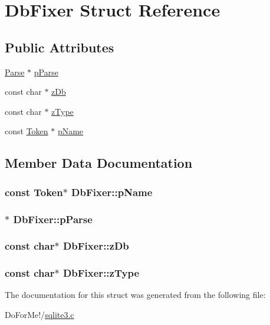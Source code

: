 \hypertarget{struct_db_fixer}{\section{Db\-Fixer Struct Reference}
\label{struct_db_fixer}
}
\subsection*{Public Attributes}
\begin{DoxyCompactItemize}
\item 
\hyperlink{struct_parse}{Parse} $\ast$ \hyperlink{struct_db_fixer_ac5c9b8bca3b05a66faea11dd998bf6f6}{p\-Parse}
\item 
const char $\ast$ \hyperlink{struct_db_fixer_aba91df5965a99915d9180805d02c4a7f}{z\-Db}
\item 
const char $\ast$ \hyperlink{struct_db_fixer_ae4748d9e97560b7b332527434408c2e8}{z\-Type}
\item 
const \hyperlink{struct_token}{Token} $\ast$ \hyperlink{struct_db_fixer_aedee20e10de7337651b84656ee81b39c}{p\-Name}
\end{DoxyCompactItemize}


\subsection{Member Data Documentation}
\hypertarget{struct_db_fixer_aedee20e10de7337651b84656ee81b39c}{
\subsubsection[{p\-Name}]{\setlength{\rightskip}{0pt plus 5cm}const {\bf Token}$\ast$ Db\-Fixer\-::p\-Name}}\label{struct_db_fixer_aedee20e10de7337651b84656ee81b39c}
\hypertarget{struct_db_fixer_ac5c9b8bca3b05a66faea11dd998bf6f6}{
\subsubsection[{p\-Parse}]{$\ast$ Db\-Fixer\-::p\-Parse}}\label{struct_db_fixer_ac5c9b8bca3b05a66faea11dd998bf6f6}
\hypertarget{struct_db_fixer_aba91df5965a99915d9180805d02c4a7f}{
\subsubsection[{z\-Db}]{\setlength{\rightskip}{0pt plus 5cm}const char$\ast$ Db\-Fixer\-::z\-Db}}\label{struct_db_fixer_aba91df5965a99915d9180805d02c4a7f}
\hypertarget{struct_db_fixer_ae4748d9e97560b7b332527434408c2e8}{
\subsubsection[{z\-Type}]{\setlength{\rightskip}{0pt plus 5cm}const char$\ast$ Db\-Fixer\-::z\-Type}}\label{struct_db_fixer_ae4748d9e97560b7b332527434408c2e8}


The documentation for this struct was generated from the following file\-:\begin{DoxyCompactItemize}
\item 
Do\-For\-Me!/\hyperlink{sqlite3_8c}{sqlite3.\-c}\end{DoxyCompactItemize}
